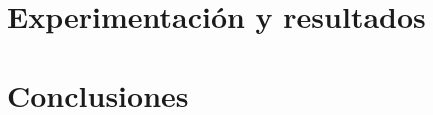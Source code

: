 \documentclass[12pt,a4paper]{article}
\begin{document}
	
\section{Experimentación y resultados}




\newpage



\section{Conclusiones}









\end{document}
